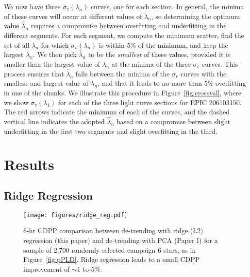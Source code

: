 \documentclass[]{emulateapj}
\begin{document}
We now have three $\sigma_v(\lambda_n)$ curves, one for each section. In general, the
minima of these curves will occur at different values of $\lambda_n$, so determining
the optimum value $\hat{\lambda}_n$ requires a compromise between overfitting and
underfitting in the different segments. For each segment, we compute the minimum scatter, 
find the set of all $\lambda_n$
for which $\sigma_v(\lambda_n)$ is within 5\% of the minimum, and keep the largest
$\lambda_n$. We then pick $\hat{\lambda}_n$ to be the \emph{smallest} of these
values, provided it is smaller than the largest value of $\lambda_n$ at the minima
of the three $\sigma_v$ curves. This process ensures that $\hat{\lambda}_n$ falls
between the minima of the $\sigma_v$ curves with the smallest and largest value of
$\lambda_n$, and that it leads to no more than 5\% overfitting in
one of the chunks. We illustrate this procedure in Figure~\ref{fig:crossval}, where
we show $\sigma_v(\lambda_1)$ for each of the three light curve sections for
EPIC 206103150. The red arrows indicate the minimum of each of the curves, and the
dashed vertical line indicates the adopted $\hat{\lambda}_n$ based on a compromise
between slight underfitting in the first two segments and slight overfitting in the
third.

\section{Results}
\label{sec:results}

\subsection{Ridge Regression}
\begin{figure}[ht]
  \begin{center}
      \texttt{[image: figures/ridge\_reg.pdf]}
       \caption{6-hr CDPP comparison between de-trending with ridge (L2) regression (this paper) and
                de-trending with PCA (Paper I) for a sample of 2,700 randomly selected campaign 6
                stars, as in Figure~\ref{fig:pPLD}. Ridge regression leads to a small CDPP improvement of 
                ${\sim}1$ to 5\%.}
     \label{fig:ridge_reg}
  \end{center}
\end{figure}
\end{document}
